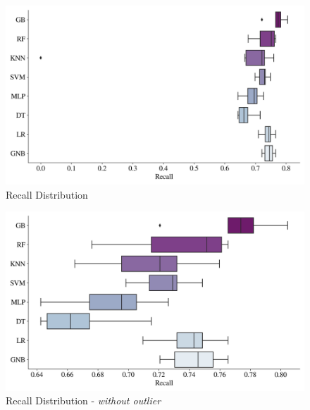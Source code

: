 \begin{figure}[H]
    \centering
    \caption{Recall Distribution}\vspace{0.5em}
    \label{fig:reccdist}
    \includegraphics[width=140mm]{Figures/RECALL_Distribution.jpg}
    
    \vspace{-1em}
\end{figure}

\begin{figure}[H]
    \centering
    \caption{Recall Distribution - \textit{without outlier}}\vspace{0.5em}
    \label{fig:recdistwoout}
    \includegraphics[width=140mm]{Figures/RECALL_WO_OUTLIERS_Distribution.jpg}
    
    \vspace{-1em}
\end{figure}

